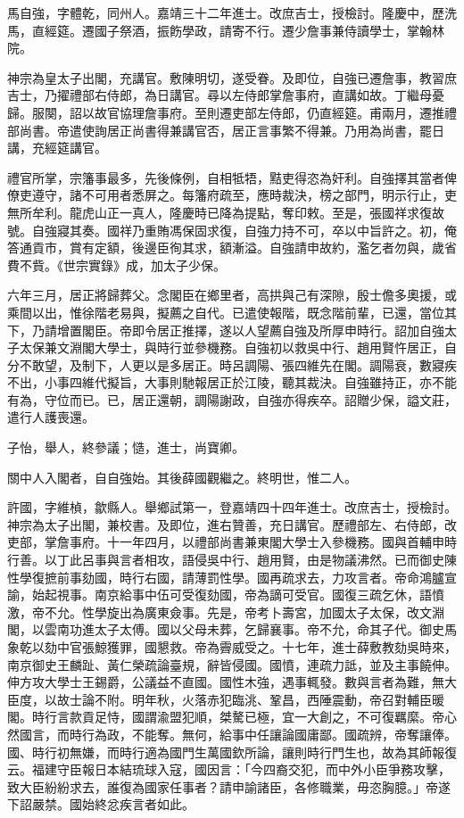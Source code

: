 \begin{pinyinscope}
馬自強，字體乾，同州人。嘉靖三十二年進士。改庶吉士，授檢討。隆慶中，歷洗馬，直經筵。遷國子祭酒，振飭學政，請寄不行。遷少詹事兼侍讀學士，掌翰林院。

神宗為皇太子出閣，充講官。敷陳明切，遂受眷。及即位，自強已遷詹事，教習庶吉士，乃擢禮部右侍郎，為日講官。尋以左侍郎掌詹事府，直講如故。丁繼母憂歸。服闋，詔以故官協理詹事府。至則遷吏部左侍郎，仍直經筵。甫兩月，遷推禮部尚書。帝遣使詢居正尚書得兼講官否，居正言事繁不得兼。乃用為尚書，罷日講，充經筵講官。

禮官所掌，宗籓事最多，先後條例，自相牴牾，黠吏得恣為奸利。自強擇其當者俾僚吏遵守，諸不可用者悉屏之。每籓府疏至，應時裁決，榜之部門，明示行止，吏無所牟利。龍虎山正一真人，隆慶時已降為提點，奪印敕。至是，張國祥求復故號。自強寢其奏。國祥乃重賄馮保固求復，自強力持不可，卒以中旨許之。初，俺答通貢市，賞有定額，後邊臣徇其求，額漸溢。自強請申故約，濫乞者勿與，歲省費不貲。《世宗實錄》成，加太子少保。

六年三月，居正將歸葬父。念閣臣在鄉里者，高拱與己有深隙，殷士儋多奧援，或乘間以出，惟徐階老易與，擬薦之自代。已遣使報階，既念階前輩，已還，當位其下，乃請增置閣臣。帝即令居正推擇，遂以人望薦自強及所厚申時行。詔加自強太子太保兼文淵閣大學士，與時行並參機務。自強初以救吳中行、趙用賢忤居正，自分不敢望，及制下，人更以是多居正。時呂調陽、張四維先在閣。調陽衰，數寢疾不出，小事四維代擬旨，大事則馳報居正於江陵，聽其裁決。自強雖持正，亦不能有為，守位而已。已，居正還朝，調陽謝政，自強亦得疾卒。詔贈少保，謚文莊，遣行人護喪還。

子怡，舉人，終參議；慥，進士，尚寶卿。

關中人入閣者，自自強始。其後薛國觀繼之。終明世，惟二人。

許國，字維楨，歙縣人。舉鄉試第一，登嘉靖四十四年進士。改庶吉士，授檢討。神宗為太子出閣，兼校書。及即位，進右贊善，充日講官。歷禮部左、右侍郎，改吏部，掌詹事府。十一年四月，以禮部尚書兼東閣大學士入參機務。國與首輔申時行善。以丁此呂事與言者相攻，語侵吳中行、趙用賢，由是物議沸然。已而御史陳性學復摭前事劾國，時行右國，請薄罰性學。國再疏求去，力攻言者。帝命鴻臚宣諭，始起視事。南京給事中伍可受復劾國，帝為謫可受官。國復三疏乞休，語憤激，帝不允。性學旋出為廣東僉事。先是，帝考卜壽宮，加國太子太保，改文淵閣，以雲南功進太子太傅。國以父母未葬，乞歸襄事。帝不允，命其子代。御史馬象乾以劾中官張鯨獲罪，國懇救。帝為霽威受之。十七年，進士薛敷教劾吳時來，南京御史王麟趾、黃仁榮疏論臺規，辭皆侵國。國憤，連疏力詆，並及主事饒伸。伸方攻大學士王錫爵，公議益不直國。國性木強，遇事輒發。數與言者為難，無大臣度，以故士論不附。明年秋，火落赤犯臨洮、鞏昌，西陲震動，帝召對輔臣暖閣。時行言款貢足恃，國謂渝盟犯順，桀驁已極，宜一大創之，不可復羈縻。帝心然國言，而時行為政，不能奪。無何，給事中任讓論國庸鄙。國疏辨，帝奪讓俸。國、時行初無嫌，而時行適為國門生萬國欽所論，讓則時行門生也，故為其師報復云。福建守臣報日本結琉球入寇，國因言：「今四裔交犯，而中外小臣爭務攻擊，致大臣紛紛求去，誰復為國家任事者？請申諭諸臣，各修職業，毋恣胸臆。」帝遂下詔嚴禁。國始終忿疾言者如此。


\end{pinyinscope}
